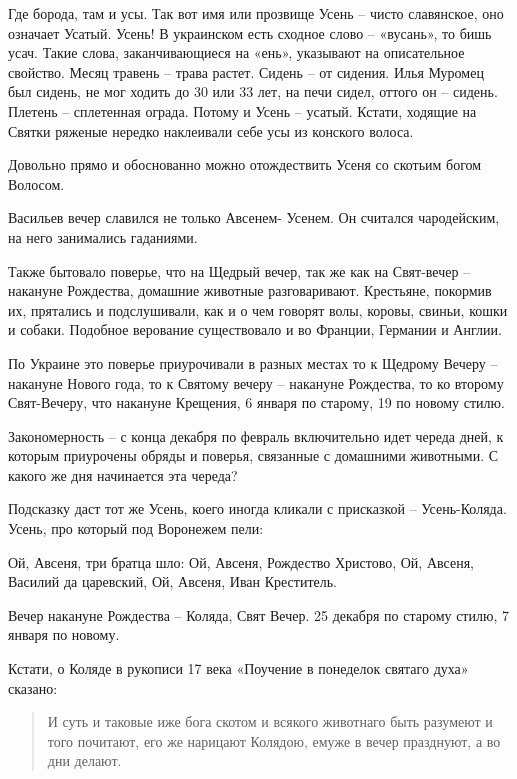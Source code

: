 \documentclass[a5paper,11pt,openany]{article}
\begin{document}
 Где борода, там и усы. Так вот имя или прозвище Усень – чисто славянское, оно означает Усатый. Усень! В украинском есть сходное слово – «вусань», то бишь усач. Такие слова, заканчивающиеся на «ень», указывают на описательное свойство. Месяц травень – трава растет. Сидень – от сидения. Илья Муромец был сидень, не мог ходить до 30 или 33 лет, на печи сидел, оттого он – сидень. Плетень – сплетенная ограда. Потому и Усень – усатый. Кстати, ходящие на Святки ряженые нередко наклеивали себе усы из конского волоса.

   Довольно прямо и обоснованно можно отождествить Усеня со скотьим богом Волосом.

  Васильев вечер славился не только Авсенем- Усенем. Он считался чародейским, на него занимались гаданиями.

  Также бытовало поверье, что на Щедрый вечер, так же как на Свят-вечер – накануне Рождества, домашние животные разговаривают. Крестьяне, покормив их, прятались и подслушивали, как и о чем говорят волы, коровы, свиньи, кошки и собаки. Подобное верование существовало и во Франции, Германии и Англии. 

  По Украине это поверье приурочивали в разных местах то к Щедрому Вечеру – накануне Нового года, то к Святому вечеру – накануне Рождества, то ко второму Свят-Вечеру, что накануне Крещения, 6 января по старому, 19 по новому стилю.

 Закономерность – с конца декабря по февраль включительно идет череда дней, к которым приурочены обряды и поверья, связанные с домашними животными. С какого же дня начинается эта череда?

   Подсказку даст тот же Усень, коего иногда кликали с присказкой – Усень-Коляда. Усень, про который под Воронежем пели: 

\noindent
Ой, Авсеня, три братца шло:\newline
 Ой, Авсеня, Рождество Христово, \newline
Ой, Авсеня, Василий да царевский, \newline
Ой, Авсеня, Иван Креститель.\newline

  Вечер накануне Рождества – Коляда, Свят Вечер. 25 декабря по старому стилю, 7 января по новому. 

   Кстати, о Коляде в рукописи 17 века «Поучение в понеделок святаго духа» сказано:

\begin{quotation}
И суть и таковые иже бога скотом и всякого животнаго быть разумеют и того почитают, его же нарицают Колядою, емуже в вечер празднуют, а во дни делают.
\end{quotation}
\end{document}

